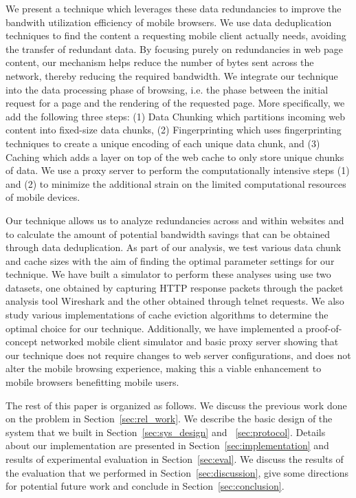 We present a technique which leverages these data redundancies to improve the bandwith utilization efficiency of mobile browsers. We use data deduplication 
techniques to find the content a requesting mobile client actually needs, avoiding the transfer of redundant data. By focusing purely on redundancies in web 
page content, our mechanism helps reduce the number of bytes sent across the network, thereby reducing the required bandwidth. We integrate our technique into 
the data processing phase of browsing, i.e. the phase between the initial request for a page and the rendering of the requested page. More specifically, we add 
the following three steps: (1) Data Chunking which partitions incoming web content into fixed-size data chunks, (2) Fingerprinting which uses fingerprinting 
techniques to create a unique encoding of each unique data chunk, and (3) Caching which adds a layer on top of the web cache to only store unique chunks of data. 
We use a proxy server to perform the computationally intensive steps (1) and (2) to minimize the additional strain on the limited computational resources of mobile 
devices.


Our technique allows us to analyze redundancies across and within websites and to calculate the amount of potential bandwidth savings that can be obtained through data deduplication. As part of our analysis, we test various data chunk and cache sizes with the aim of finding the optimal parameter settings for our technique. We have built a simulator to perform these analyses using use two datasets, one obtained by capturing HTTP response packets through the packet analysis tool Wireshark and the other obtained through telnet requests. We also study various implementations of cache eviction algorithms to determine the optimal choice for our technique. Additionally, we have implemented a proof-of-concept networked mobile client simulator and basic proxy server showing that our technique does not require changes to web server configurations, and does not alter the mobile browsing experience, making this a viable enhancement to mobile browsers benefitting mobile users.

The rest of this paper is organized as follows. We discuss the previous work done on the problem in Section~\ref{sec:rel_work}. We describe the basic design of the 
system that we built in Section~\ref{sec:sys_design} and ~\ref{sec:protocol}. Details about our implementation are presented in Section~\ref{sec:implementation} 
and results of experimental evaluation in Section~\ref{sec:eval}. We discuss the results of the evaluation that we performed in Section~\ref{sec:discussion}, give 
some directions for potential future work and conclude in Section~\ref{sec:conclusion}.
